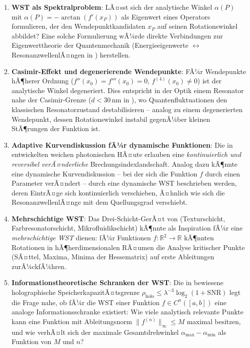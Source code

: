 ﻿\documentclass[12pt, a4paper]{article}
\theoremstyle{definition}
\begin{document}
	\begin{enumerate}[leftmargin=*, label=\textbf{F\arabic*.}]
		\item \textbf{WST als Spektralproblem}: LÃ¤sst sich der analytische Winkel
		$\alpha(P)$ mit $\alpha(P) = -\arctan(f'(x_P))$ als Eigenwert eines Operators
		formulieren, der den Wendepunktkandidaten $x_P$ auf seinen
		Rotationswinkel abbildet? Eine solche Formulierung wÃ¼rde direkte
		Verbindungen zur Eigenwerttheorie der Quantenmechanik (Energieeigenwerte
		$\leftrightarrow$ ResonanzwellenlÃ¤ngen in \cite{oqtum}) herstellen.
		
		\item \textbf{Casimir-Effekt und degenerierende Wendepunkte}: FÃ¼r
		Wendepunkte hÃ¶herer Ordnung ($f''(x_0) = f'''(x_0) = 0$,
		$f^{(4)}(x_0) \neq 0$) ist der analytische Winkel degeneriert.
		Dies entspricht in der Optik einem Resonator nahe der Casimir-Grenze
		($d < 30\,$nm in \cite{oqtum}), wo Quantenfluktuationen den
		klassischen Resonatorzustand destabilisieren -- analog zu einem
		degenerierten Wendepunkt, dessen Rotationswinkel instabil gegenÃ¼ber
		kleinen StÃ¶rungen der Funktion ist.
		
		\item \textbf{Adaptive Kurvendiskussion fÃ¼r dynamische Funktionen}: Die in
		\cite{oqtum} entwickelten weichen photonischen HÃ¤ute erlauben eine
		\emph{kontinuierlich und reversibel verÃ¤nderliche} Brechungsindexlandschaft.
		Analog dazu kÃ¶nnte eine dynamische Kurvendiskussion -- bei der sich die
		Funktion $f$ durch einen Parameter verÃ¤ndert -- durch eine dynamische
		WST beschrieben werden, deren EintrÃ¤ge sich kontinuierlich verschieben,
		Ã¤hnlich wie sich die ResonanzwellenlÃ¤nge mit dem Quellungsgrad verschiebt.
		
		\item \textbf{Mehrschichtige WST}: Das Drei-Schicht-GerÃ¤t von \cite{oqtum}
		(Texturschicht, Farbresonatorschicht, Mikrofluidikschicht) kÃ¶nnte
		als Inspiration fÃ¼r eine \emph{mehrschichtige WST} dienen: fÃ¼r Funktionen
		$f: \mathbb{R}^2 \to \mathbb{R}$ kÃ¶nnten Rotationen in hÃ¶herdimensionalen
		RÃ¤umen die Analyse kritischer Punkte (SÃ¤ttel, Maxima, Minima der
		Hessematrix) auf erste Ableitungen zurÃ¼ckfÃ¼hren.
		
		\item \textbf{Informationstheoretische Schranken der WST}: Die in \cite{oqtum}
		bewiesene holographische SpeicherkapazitÃ¤tsgrenze
		$\rho_\mathrm{holo} \leq \lambda^{-3}\log_2(1+\mathrm{SNR})$
		legt die Frage nahe, ob fÃ¼r die WST einer Funktion $f \in C^n([a,b])$
		eine analoge Informationsschranke existiert: Wie viele analytisch
		relevante Punkte kann eine Funktion mit Ableitungsnorm $\|f^{(n)}\|_\infty \leq M$
		maximal besitzen, und wie verhÃ¤lt sich der maximale Gesamtdrehwinkel
		$\alpha_\mathrm{max} - \alpha_\mathrm{min}$ als Funktion von $M$ und $n$?
		

\end{enumerate}
\end{document}
